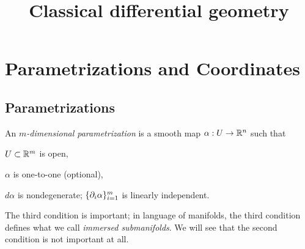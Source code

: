 \documentclass{../exp}
\title{Classical differential geometry}
\def\a{\alpha}
\begin{document}
\maketitle
\tableofcontents







\section{Parametrizations and Coordinates}
\subsection{Parametrizations}
\begin{defn}
An \emph{$m$-dimensional parametrization} is a smooth map $\a:U\to\R^n$ such that
\begin{cond}
\item $U\subset\mathbb{R}^m$ is open,
\item $\a$ is one-to-one (optional),
\item $d\a$ is nondegenerate; $\{\pd_i\a\}_{i=1}^m$ is linearly independent.
\end{cond}
\end{defn}
The third condition is important; in language of manifolds, the third condition defines what we call \emph{immersed submanifolds}.
We will see that the second condition is not important at all.
\end{document}
